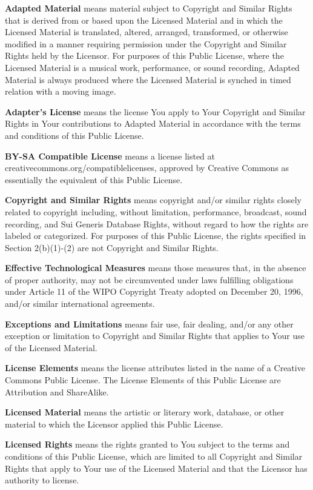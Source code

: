 \begin{doclicense@enumerate}
\item \textbf{Adapted Material} means material subject to Copyright and Similar Rights that is derived from or based upon the Licensed Material and in which the Licensed Material is translated, altered, arranged, transformed, or otherwise modified in a manner requiring permission under the Copyright and Similar Rights held by the Licensor. For purposes of this Public License, where the Licensed Material is a musical work, performance, or sound recording, Adapted Material is always produced where the Licensed Material is synched in timed relation with a moving image.
\item \textbf{Adapter's License} means the license You apply to Your Copyright and Similar Rights in Your contributions to Adapted Material in accordance with the terms and conditions of this Public License.
\item \textbf{BY-SA Compatible License} means a license listed at  creativecommons.org/compatiblelicenses, approved by Creative Commons as essentially the equivalent of this Public License.
\item \textbf{Copyright and Similar Rights} means copyright and/or similar rights closely related to copyright including, without limitation, performance, broadcast, sound recording, and Sui Generis Database Rights, without regard to how the rights are labeled or categorized. For purposes of this Public License, the rights specified in Section 2(b)(1)-(2) are not Copyright and Similar Rights.
\item \textbf{Effective Technological Measures} means those measures that, in the absence of proper authority, may not
be circumvented under laws fulfilling obligations under Article 11 of the WIPO Copyright Treaty adopted on December 20, 1996, and/or similar
international agreements.
\item \textbf{Exceptions and Limitations} means fair use, fair dealing, and/or any other exception or limitation to Copyright and Similar Rights that applies to Your use of the Licensed Material.
\item \textbf{License Elements} means the license attributes listed in the name of a Creative Commons Public License. The License Elements of this Public License are Attribution and ShareAlike.
\item \textbf{Licensed Material} means the artistic or literary work, database, or other material to which the Licensor applied this Public License.
\item \textbf{Licensed Rights} means the rights granted to You subject to the terms and conditions of this Public License, which are limited to all Copyright and Similar Rights that apply to Your use of the Licensed Material and that the Licensor has authority to license.

\end{doclicense@enumerate}
